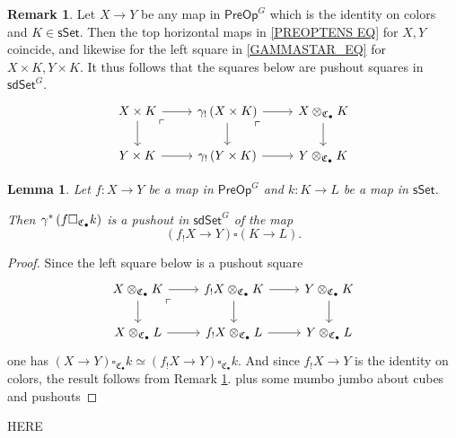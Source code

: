\documentclass[a4paper,10pt
,draft
]{article}%
\numberwithin{equation}{section}
\numberwithin{figure}{section}
\newtheorem{lemma}[equation]{Lemma}%
\theoremstyle{definition} %
\newtheorem{remark}[equation]{Remark}%
\newcommand{\1}{\ensuremath{\mathbbm 1}}%
\begin{document}
\begin{remark}\label{COLORTENSGAM REM}
	Let $X \to Y$ be any map in $\mathsf{PreOp}^G$
	which is the identity on colors and 
	$K \in \mathsf{sSet}$. 
	Then the top horizontal maps in \eqref{PREOPTENS EQ}
	for $X,Y$ coincide, 
	and likewise for the 
	left square in \eqref{GAMMASTAR_EQ} for
	$X \times K, Y \times K$.
%
	It thus follows that the squares below are pushout squares in $\mathsf{sdSet}^G$.
\[
\begin{tikzcd}
	X \times K \ar{r} \ar{d} 
	\arrow[dr, phantom, "\ulcorner", very near start] 
&
	\gamma_! \left( X \times K \right) \ar{r} \ar{d} 
	\arrow[dr, phantom, "\ulcorner", very near start] 
&
	X \otimes_{\mathfrak{C}_{\bullet}} K \ar{d}
\\
	Y \times K \ar{r} 
&
	\gamma_! \left( Y \times K \right) \ar{r} 
&
	Y \otimes_{\mathfrak{C}_{\bullet}} K
\end{tikzcd}
\]
\end{remark}



\begin{lemma}\label{OTIMSETPUSH LEM}
	Let $f\colon X \to Y$ be a map in $\mathsf{PreOp}^G$
	and $k \colon K \to L$ be a map in $\mathsf{sSet}$.

	Then $\gamma^{\**}\left(f \square_{\mathfrak{C}_{\bullet}} k\right)$
	is a pushout in $\mathsf{sdSet}^G$
	of the map
\[
	\left(f_! X \to Y\right)
	\square
	\left( K \to L \right).
\]
\end{lemma}


\begin{proof}
Since the left square below is a pushout square
\[
\begin{tikzcd}
	X \otimes_{\mathfrak{C}_{\bullet}} K \ar{r} \ar{d} 
	\arrow[dr, phantom, "\ulcorner", very near start]
&
	f_! X \otimes_{\mathfrak{C}_{\bullet}} K \ar{r} \ar{d} 
&
	Y \otimes_{\mathfrak{C}_{\bullet}} K \ar{d}
\\
	X \otimes_{\mathfrak{C}_{\bullet}} L \ar{r} 
&
	f_! X \otimes_{\mathfrak{C}_{\bullet}} L \ar{r} 
&
	Y \otimes_{\mathfrak{C}_{\bullet}} L
\end{tikzcd}
\]
one has
$(X \to Y) \square_{\mathfrak{C}_{\bullet}} k 
\simeq 
(f_!X \to Y) \square_{\mathfrak{C}_{\bullet}} k$.
And since $f_!X \to Y$ is the identity on colors,
the result follows from Remark \ref{COLORTENSGAM REM}.
	{\color{blue} plus some mumbo jumbo about cubes and pushouts}
\end{proof}



{\color{red} HERE}
\end{document}
